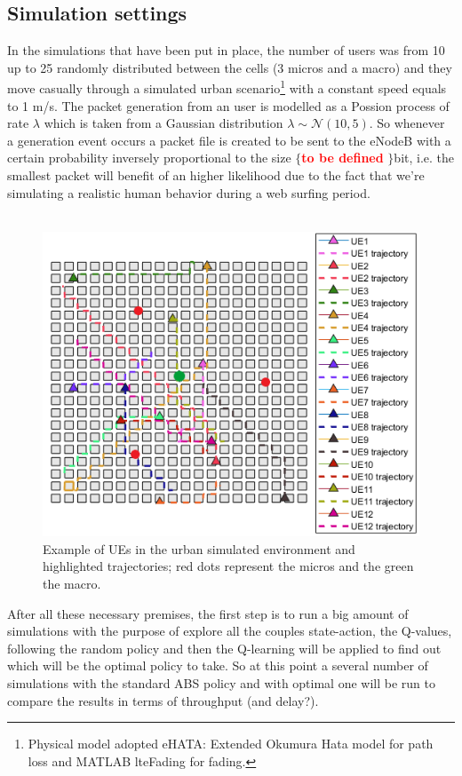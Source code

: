 \documentclass[conference,10pt]{IEEEtran}
\begin{document}
\subsection{Simulation settings}
In the simulations that have been put in place, the number of users was from 10 up to 25 randomly distributed between the cells (3 micros and a macro) and they move casually through a simulated urban scenario\footnote{Physical model adopted eHATA: Extended Okumura Hata model for path loss and MATLAB lteFading for fading.}  with a constant speed equals to 1 m/s. The packet generation from an user is modelled as a Possion process of rate $\lambda$ which is taken from a Gaussian distribution $\lambda \sim \mathcal{N}(10,5)$. So whenever a generation event occurs a packet file is created to be sent to the eNodeB with a certain probability inversely proportional to the size $\lbrace$\textcolor{red}{\textbf{to be defined}} $\rbrace$bit, i.e. the smallest packet will benefit of an higher likelihood due to the fact that we're simulating a realistic human behavior during a web surfing period.\\
\\
\begin{figure}[h]
\includegraphics[scale=0.68]{figures/traj.png}
\caption{Example of UEs in the urban simulated environment and highlighted trajectories; red dots represent the micros and the green the macro.} 
\end{figure}
After all these necessary premises, the first step is to run a big amount of simulations with the purpose of explore all the couples state-action, the Q-values, following the random policy and then the Q-learning will be applied to find out which will be the optimal policy to take. So at this point a several number of simulations with the standard ABS policy and with optimal one will be run to compare the results in terms of throughput (and delay?).         
\end{document}
